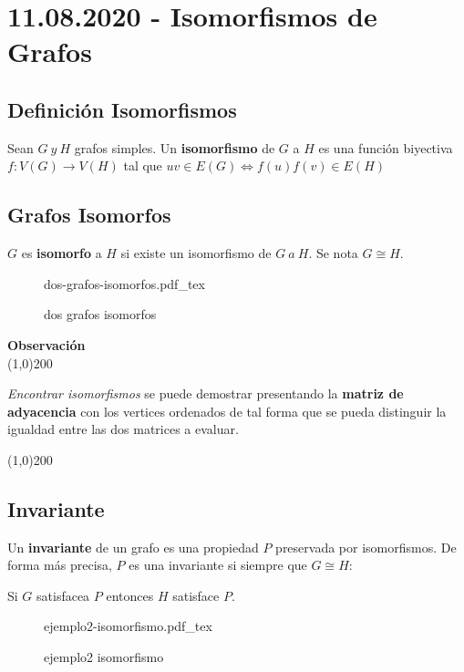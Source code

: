 \documentclass[a4paper]{book}
\newcommand{\incfig}[2][1]{%
    \def\svgwidth{#1\columnwidth}
    {#2.pdf_tex}
}
\newenvironment{obs}
    {
        \begin{flushleft}
       \textbf{Observación}\\
        \line(1,0){200} \\
        \end{flushleft}
    }
    {
        \begin{flushright}
        \line(1,0){200}
        \end{flushright}
    }
\begin{document}
\section{11.08.2020 - Isomorfismos de Grafos}
\label{sec:isomorfismos_de_grafos}

\subsection{Definición Isomorfismos}
\label{ssec:definicion_isomorfismos}

Sean \(G\ y\ H\) grafos simples. Un \textbf{isomorfismo} de \(G\) a \(H\) es
una función biyectiva \(f:V\left(G\right)\to V\left(H\right) \) tal que \(uv\in
E\left(G\right)\iff f\left(u\right) f\left(v\right) \in E\left(H\right) \)

\subsection{Grafos Isomorfos}
\label{ssec:grafos_isomorfos}

\(G\) es \textbf{isomorfo} a \(H\) si existe un isomorfismo de \(G\ a\ H\). Se nota \(G\cong H\).

\begin{figure}[ht]
    \centering
    \incfig{dos-grafos-isomorfos}
    \caption{dos grafos isomorfos}
    \label{fig:dos-grafos-isomorfos}
\end{figure}
\begin{obs}
    \textit{Encontrar isomorfismos} se puede demostrar presentando la \textbf{matriz de adyacencia} con los vertices ordenados de tal forma que se pueda distinguir la igualdad entre las dos matrices a evaluar.
\end{obs}

\subsection{Invariante}
\label{ssec:invariante}

Un \textbf{invariante} de un grafo es una propiedad \(P\) preservada por
isomorfismos. De forma más precisa, \(P\) es una invariante si siempre que
\(G\cong H\):

\begin{center}
    Si \(G\) satisfacea \(P\) entonces \(H\) satisface \(P\).
\end{center}

\begin{figure}[ht]
    \centering
    \incfig[0.5]{ejemplo2-isomorfismo}
    \caption{ejemplo2 isomorfismo}
    \label{fig:ejemplo2-isomorfismo}
\end{figure}
\end{document}
